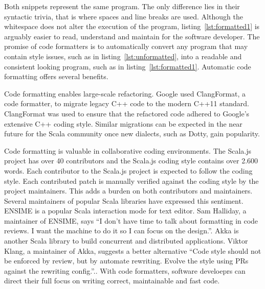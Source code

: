 \documentclass[11pt,a4paper]{article}
\newcommand{\scalafmt}{\texttt{scalafmt}}
\begin{document}
\begin{minipage}{.45\textwidth}

\end{minipage}
\hfil
\begin{minipage}{.45\textwidth}

\end{minipage}
Both snippets represent the same program.
The only difference lies in their syntactic trivia, that is where spaces and line breaks are used.
Although the whitespace does not alter the execution of the program, listing~\ref{lst:formatted1} is arguably easier to read, understand and maintain for the software developer.
The promise of code formatters is to automatically convert any program that may contain style issues, such as in listing~\ref{lst:unformatted}, into a readable and consistent looking program, such as in listing~\ref{lst:formatted1}.
Automatic code formatting offers several benefits.

Code formatting enables large-scale refactoring.
Google used ClangFormat\autocite{jasper_clang-format_????}, a code formatter, to migrate legacy C++ code to the modern C++11 standard\autocite{wright_large-scale_2013}.
ClangFormat was used to ensure that the refactored code adhered to Google's extensive C++ coding style\autocite{_google_????}.
Similar migrations can be expected in the near future for the Scala community once new dialects, such as Dotty\autocite{rompf_f_2015}, gain popularity.

Code formatting is valuable in collaborative coding environments.
The Scala.js project\autocite{_scala.js_????} has over 40 contributors and the Scala.js coding style\autocite{_scala.js_????-1} contains over 2.600 words.
Each contributor to the Scala.js project is expected to follow the coding style.
Each contributed patch is manually verified against the coding style by the project maintainers.
This adds a burden on both contributors and maintainers.
Several maintainers of popular Scala libraries have expressed this sentiment.
ENSIME\autocite{_ensime_????} is a popular Scala interaction mode for text editor.
Sam Halliday, a maintainer of ENSIME, says ``I don't have time to talk about formatting in code reviews. I want the machine to do it so I can focus on the design.''\autocite{halliday_i_2016-1}.
Akka\autocite{_akka_????} is another Scala library to build concurrent and distributed applications.
Viktor Klang, a maintainer of Akka, suggests a better alternative ``Code style should not be enforced by review, but by automate rewriting. Evolve the style using PRs against the rewriting config.''.\autocite{klang_code_2016}.
With code formatters, software develoeprs can direct their full focus on writing correct, maintainable and fast code.
\end{document}
